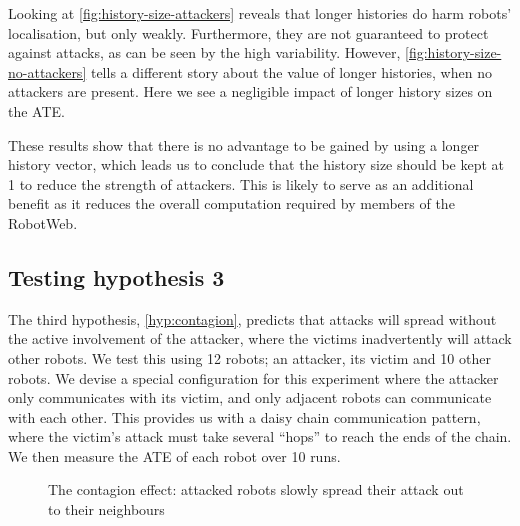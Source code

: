 Looking at \autoref{fig:history-size-attackers} reveals that longer histories do harm robots' localisation, but only weakly. Furthermore, they are not guaranteed to protect against attacks, as can be seen by the high variability. However, \autoref{fig:history-size-no-attackers} tells a different story about the value of longer histories, when no attackers are present. Here we see a negligible impact of longer history sizes on the ATE.

These results show that there is no advantage to be gained by using a longer history vector, which leads us to conclude that the history size should be kept at 1 to reduce the strength of attackers. This is likely to serve as an additional benefit as it reduces the overall computation required by members of the RobotWeb.

\subsection{Testing hypothesis 3}
The third hypothesis, \ref{hyp:contagion}, predicts that attacks will spread without the active involvement of the attacker, where the victims inadvertently will attack other robots. We test this using 12 robots; an attacker, its victim and 10 other robots. We devise a special configuration for this experiment where the attacker only communicates with its victim, and only adjacent robots can communicate with each other. This provides us with a daisy chain communication pattern, where the victim's attack must take several ``hops'' to reach the ends of the chain. We then measure the ATE of each robot over 10 runs. 

\begin{figure}[!h]
	\centering
	\caption{The contagion effect: attacked robots slowly spread their attack out to their neighbours}
	\label{fig:contagion}
\end{figure}

